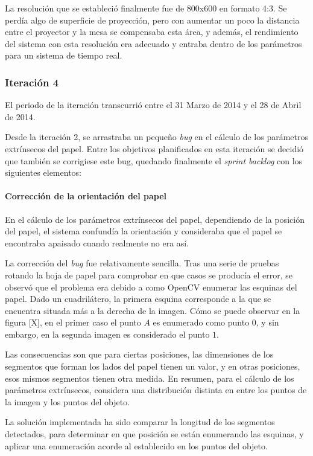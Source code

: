 La resolución que se estableció finalmente fue de 800x600 en formato 4:3. Se perdía algo de superficie de proyección, pero con aumentar un poco la distancia entre el proyector y la mesa se compensaba esta área, y además, el rendimiento del sistema con esta resolución era adecuado y entraba dentro de los parámetros para un sistema de tiempo real.

\subsubsection{Iteración 4}
El periodo de la iteración transcurrió entre el 31 Marzo de 2014 y el 28 de Abril de 2014. 

Desde la iteración 2, se arrastraba un pequeño \textit{bug} en el cálculo de los parámetros extrínsecos del papel. Entre los objetivos planificados en esta iteración se decidió que también se corrigiese este bug, quedando finalmente el \textit{sprint backlog} con los siguientes elementos:

\paragraph{Corrección de la orientación del papel}
En el cálculo de los parámetros extrínsecos del papel, dependiendo de la posición del papel, el sistema confundía la orientación y consideraba que el papel se encontraba apaisado cuando realmente no era así.

La corrección del \textit{bug} fue relativamente sencilla. Tras una serie de pruebas rotando la hoja de papel para comprobar en que casos se producía el error, se observó que el problema era debido a como OpenCV enumerar las esquinas del papel. Dado un cuadrilátero, la primera esquina corresponde a la que se encuentra situada más a la derecha de la imagen. Cómo se puede observar en la figura [X], en el primer caso el punto $A$ es enumerado como punto $0$, y sin embargo, en la segunda imagen es considerado el punto $1$. 

Las consecuencias son que para ciertas posiciones, las dimensiones de los segmentos que forman los lados del papel tienen un valor, y en otras posiciones, esos mismos segmentos tienen otra medida. En resumen, para el cálculo de los parámetros extrínsecos, considera una distribución distinta en entre los puntos de la imagen y los puntos del objeto.

La solución implementada ha sido comparar la longitud de los segmentos detectados, para determinar en que posición se están enumerando las esquinas, y aplicar una enumeración acorde al establecido en los puntos del objeto. 
 
